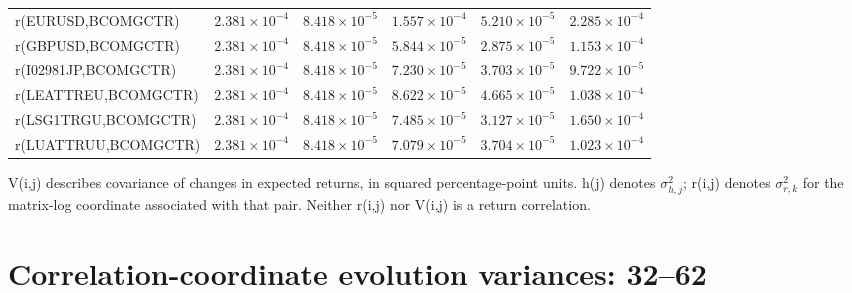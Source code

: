\documentclass[10pt,a4paper]{article}
\begin{document}
\begin{tabular*}{\linewidth}{@{\extracolsep{\fill}}lrrrrr@{}}
r(EURUSD,BCOMGCTR) & $2.381\times10^{-4}$ & $8.418\times10^{-5}$ & $1.557\times10^{-4}$ & $5.210\times10^{-5}$ & $2.285\times10^{-4}$ \\
r(GBPUSD,BCOMGCTR) & $2.381\times10^{-4}$ & $8.418\times10^{-5}$ & $5.844\times10^{-5}$ & $2.875\times10^{-5}$ & $1.153\times10^{-4}$ \\
r(I02981JP,BCOMGCTR) & $2.381\times10^{-4}$ & $8.418\times10^{-5}$ & $7.230\times10^{-5}$ & $3.703\times10^{-5}$ & $9.722\times10^{-5}$ \\
r(LEATTREU,BCOMGCTR) & $2.381\times10^{-4}$ & $8.418\times10^{-5}$ & $8.622\times10^{-5}$ & $4.665\times10^{-5}$ & $1.038\times10^{-4}$ \\
r(LSG1TRGU,BCOMGCTR) & $2.381\times10^{-4}$ & $8.418\times10^{-5}$ & $7.485\times10^{-5}$ & $3.127\times10^{-5}$ & $1.650\times10^{-4}$ \\
r(LUATTRUU,BCOMGCTR) & $2.381\times10^{-4}$ & $8.418\times10^{-5}$ & $7.079\times10^{-5}$ & $3.704\times10^{-5}$ & $1.023\times10^{-4}$ \\
\bottomrule
\end{tabular*}\endgroup
\par\medskip\footnotesize
V(i,j) describes covariance of changes in expected returns, in squared percentage-point units.
h(j) denotes $\sigma_{h,j}^{2}$; r(i,j) denotes $\sigma_{r,k}^{2}$ for the matrix-log coordinate
associated with that pair. Neither r(i,j) nor V(i,j) is a return correlation.

\clearpage\section*{Correlation-coordinate evolution variances: 32--62}
\end{document}
